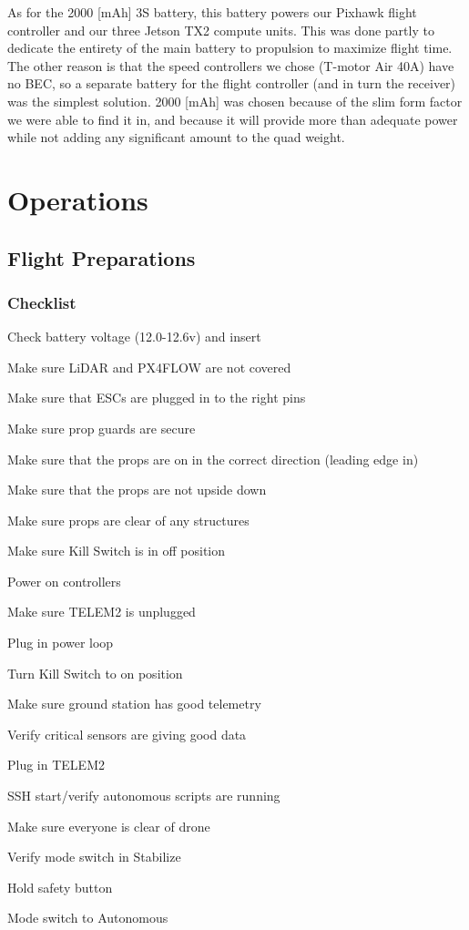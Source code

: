 \documentclass[12pt,letterpaper]{article}
\newenvironment{my_enumerate}{
	\begin{enumerate}
	\setlength{\itemsep}{1pt}
	\setlength{\parskip}{0pt}
	\setlength{\parsep}{0pt}}{\end{enumerate}
}
\begin{document}
		As for the 2000 [mAh] 3S battery, this battery powers our Pixhawk flight controller and our three Jetson TX2 compute units. This was done partly to dedicate the entirety of the main battery to propulsion to maximize flight time. The other reason is that the speed controllers we chose (T-motor Air 40A) have no BEC, so a separate battery for the flight controller (and in turn the receiver) was the simplest solution. 2000 [mAh] was chosen because of the slim form factor we were able to find it in, and because it will provide more than adequate power while not adding any significant amount to the quad weight.


\section*{Operations}
	\subsection*{Flight Preparations}
		\subsubsection*{Checklist}
			\begin{my_enumerate}
				\item Check battery voltage (12.0-12.6v) and insert
				\item Make sure LiDAR and PX4FLOW are not covered
				\item Make sure that ESCs are plugged in to the right pins
				\item Make sure prop guards are secure
				\item Make sure that the props are on in the correct direction (leading edge in)
				\item Make sure that the props are not upside down
				\item Make sure props are clear of any structures
				\item Make sure Kill Switch is in off position
				\item Power on controllers
				\item Make sure TELEM2 is unplugged
				\item Plug in power loop
				\item Turn Kill Switch to on position
				\item Make sure ground station has good telemetry
				\item Verify critical sensors are giving good data
				\item Plug in TELEM2
				\item SSH start/verify autonomous scripts are running
				\item Make sure everyone is clear of drone
				\item Verify mode switch in Stabilize
				\item Hold safety button
				\item Mode switch to Autonomous
			\end{my_enumerate}
\end{document}
